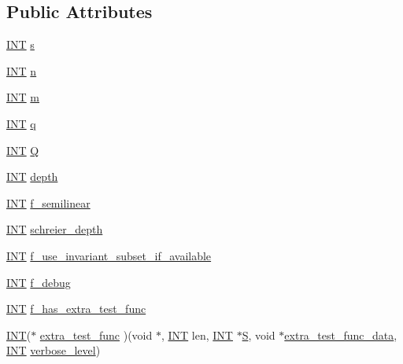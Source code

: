 \subsection*{Public Attributes}
\begin{DoxyCompactItemize}
\item 
\mbox{\hyperlink{galois_8h_a09fddde158a3a20bd2dcadb609de11dc}{I\+NT}} \mbox{\hyperlink{classlinear__set_ad4d01b16d3679869de7a1bb98f850cd2}{s}}
\item 
\mbox{\hyperlink{galois_8h_a09fddde158a3a20bd2dcadb609de11dc}{I\+NT}} \mbox{\hyperlink{classlinear__set_a2208a5df88b4ffcfb819c54cd1366f98}{n}}
\item 
\mbox{\hyperlink{galois_8h_a09fddde158a3a20bd2dcadb609de11dc}{I\+NT}} \mbox{\hyperlink{classlinear__set_a13fbd52a1264d2231b87ba767bb81d11}{m}}
\item 
\mbox{\hyperlink{galois_8h_a09fddde158a3a20bd2dcadb609de11dc}{I\+NT}} \mbox{\hyperlink{classlinear__set_a008a519d19ff8418e62c906f3fce1d42}{q}}
\item 
\mbox{\hyperlink{galois_8h_a09fddde158a3a20bd2dcadb609de11dc}{I\+NT}} \mbox{\hyperlink{classlinear__set_ab293d32594db88ecad92d41d89ea83d2}{Q}}
\item 
\mbox{\hyperlink{galois_8h_a09fddde158a3a20bd2dcadb609de11dc}{I\+NT}} \mbox{\hyperlink{classlinear__set_ac458047edb453e716e6a936aac1afef6}{depth}}
\item 
\mbox{\hyperlink{galois_8h_a09fddde158a3a20bd2dcadb609de11dc}{I\+NT}} \mbox{\hyperlink{classlinear__set_a3c74329da509c52bfa799e6005e8b416}{f\+\_\+semilinear}}
\item 
\mbox{\hyperlink{galois_8h_a09fddde158a3a20bd2dcadb609de11dc}{I\+NT}} \mbox{\hyperlink{classlinear__set_a3444ca1d9ef85f4e83c18ad8a1435985}{schreier\+\_\+depth}}
\item 
\mbox{\hyperlink{galois_8h_a09fddde158a3a20bd2dcadb609de11dc}{I\+NT}} \mbox{\hyperlink{classlinear__set_acd6824c0b528df458b9f7cdd5ff9c8ac}{f\+\_\+use\+\_\+invariant\+\_\+subset\+\_\+if\+\_\+available}}
\item 
\mbox{\hyperlink{galois_8h_a09fddde158a3a20bd2dcadb609de11dc}{I\+NT}} \mbox{\hyperlink{classlinear__set_a04f159cf2f89cdb2589f7becc1a1082d}{f\+\_\+debug}}
\item 
\mbox{\hyperlink{galois_8h_a09fddde158a3a20bd2dcadb609de11dc}{I\+NT}} \mbox{\hyperlink{classlinear__set_a6badc0fc060517a005d9b07f04d1b30a}{f\+\_\+has\+\_\+extra\+\_\+test\+\_\+func}}
\item 
\mbox{\hyperlink{galois_8h_a09fddde158a3a20bd2dcadb609de11dc}{I\+NT}}($\ast$ \mbox{\hyperlink{classlinear__set_ab8e2cc2f08a613cf2e60314da57174d4}{extra\+\_\+test\+\_\+func}} )(void $\ast$, \mbox{\hyperlink{galois_8h_a09fddde158a3a20bd2dcadb609de11dc}{I\+NT}} len, \mbox{\hyperlink{galois_8h_a09fddde158a3a20bd2dcadb609de11dc}{I\+NT}} $\ast$\mbox{\hyperlink{simeon_8_c_adab47f8243f1b5a2c31df2535d6b37d0}{S}}, void $\ast$\mbox{\hyperlink{classlinear__set_a840d0c6f1c5d0c1298b2357a1d8891ee}{extra\+\_\+test\+\_\+func\+\_\+data}}, \mbox{\hyperlink{galois_8h_a09fddde158a3a20bd2dcadb609de11dc}{I\+NT}} \mbox{\hyperlink{simeon_8_c_a818073fbcc2f439e7c56952f67386122}{verbose\+\_\+level}})

\end{DoxyCompactItemize}
